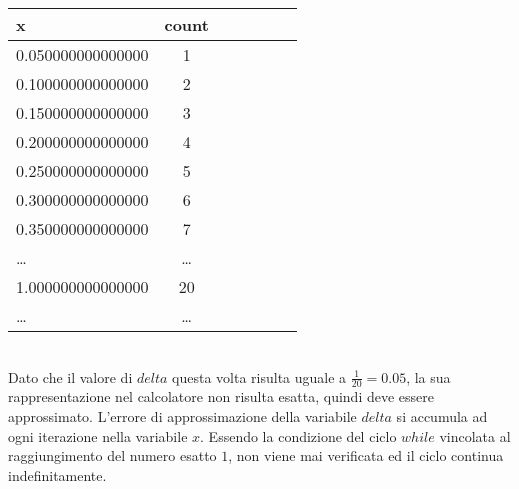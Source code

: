 \begin{tabular}{l*{6}{c}}
 x  &  count \\
\hline
 0.050000000000000 & 1 \\
 0.100000000000000 & 2 \\
 0.150000000000000 & 3 \\
 0.200000000000000 & 4 \\
 0.250000000000000 & 5 \\
 0.300000000000000 & 6 \\
 0.350000000000000 & 7 \\
 \ldots & \ldots \\
 1.000000000000000 & 20 \\
 \ldots & \ldots \\
\end{tabular} \\

Dato che il valore di \(delta\) questa volta risulta uguale a \(\frac{1}{20} = 0.05\), la sua rappresentazione nel calcolatore non risulta esatta, quindi deve essere approssimato. L'errore di approssimazione della variabile \(delta\) si accumula ad ogni iterazione nella variabile \(x\). Essendo la condizione del ciclo \(while\) vincolata al raggiungimento del numero esatto \(1\), non viene mai verificata ed il ciclo continua indefinitamente.
